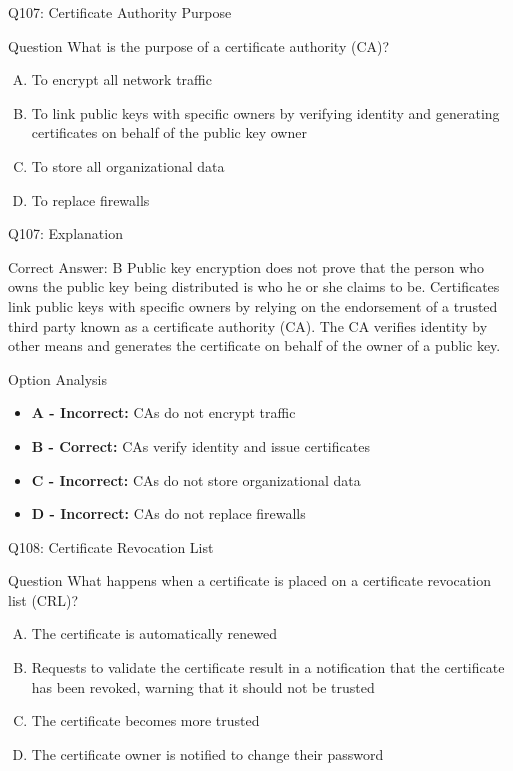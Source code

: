 \documentclass{beamer}
\begin{document}
	\begin{frame}{Q107: Certificate Authority Purpose}
		\begin{block}{Question}
			What is the purpose of a certificate authority (CA)?
		\end{block}
		\begin{enumerate}[(A)]
			\item To encrypt all network traffic
			\item To link public keys with specific owners by verifying identity and generating certificates on behalf of the public key owner
			\item To store all organizational data
			\item To replace firewalls
		\end{enumerate}
	\end{frame}
	
	\begin{frame}{Q107: Explanation}
		\begin{block}{Correct Answer: B}
			Public key encryption does not prove that the person who owns the public key being distributed is who he or she claims to be. Certificates link public keys with specific owners by relying on the endorsement of a trusted third party known as a certificate authority (CA). The CA verifies identity by other means and generates the certificate on behalf of the owner of a public key.
		\end{block}
		\begin{block}{Option Analysis}
			\begin{itemize}
				\item \textbf{A - Incorrect:} CAs do not encrypt traffic
				\item \textbf{B - Correct:} CAs verify identity and issue certificates
				\item \textbf{C - Incorrect:} CAs do not store organizational data
				\item \textbf{D - Incorrect:} CAs do not replace firewalls
			\end{itemize}
		\end{block}
	\end{frame}
	
	\begin{frame}{Q108: Certificate Revocation List}
		\begin{block}{Question}
			What happens when a certificate is placed on a certificate revocation list (CRL)?
		\end{block}
		\begin{enumerate}[(A)]
			\item The certificate is automatically renewed
			\item Requests to validate the certificate result in a notification that the certificate has been revoked, warning that it should not be trusted
			\item The certificate becomes more trusted
			\item The certificate owner is notified to change their password
		\end{enumerate}
	\end{frame}
	
\end{document}
